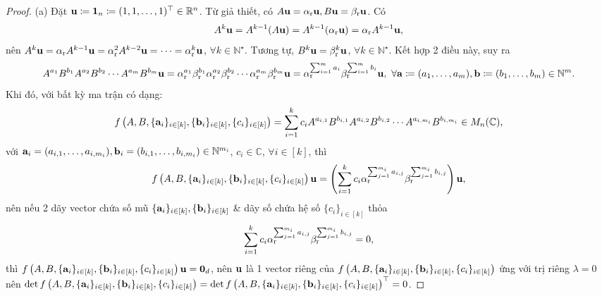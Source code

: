 \documentclass{article}
\begin{document}
\begin{proof}
	(a) Đặt ${\bf u}\coloneqq{\bf1}_n\coloneqq(1,1,\ldots,1)^\top\in\mathbb{R}^n$. Từ giả thiết, có $A{\bf u} = \alpha_{\rm r}{\bf u},B{\bf u} = \beta_{\rm r}{\bf u}$. Có
	\begin{equation*}
		A^k{\bf u} = A^{k-1}(A{\bf u}) = A^{k-1}(\alpha_{\rm r}{\bf u}) = \alpha_{\rm r}A^{k-1}{\bf u},
	\end{equation*}
	nên $A^k{\bf u} = \alpha_{\rm r}A^{k-1}{\bf u} = \alpha_{\rm r}^2A^{k-2}{\bf u} = \cdots = \alpha_{\rm r}^k{\bf u}$, $\forall k\in\mathbb{N}^\star$. Tương tự, $B^k{\bf u} = \beta_{\rm r}^k{\bf u}$, $\forall k\in\mathbb{N}^\star$. Kết hợp 2 điều này, suy ra
	\begin{equation*}
		A^{a_1}B^{b_1}A^{a_2}B^{b_2}\cdots A^{a_m}B^{b_m}{\bf u} = \alpha_{\rm r}^{a_1}\beta_{\rm r}^{b_1}\alpha_{\rm r}^{a_2}\beta_{\rm r}^{b_2}\cdots\alpha_{\rm r}^{a_m}\beta_{\rm r}^{b_m}{\bf u} = \alpha_{\rm r}^{\sum_{i=1}^m a_i}\beta_{\rm r}^{\sum_{i=1}^m b_i}{\bf u},\ \forall{\bf a}\coloneqq(a_1,\ldots,a_m),{\bf b}\coloneqq(b_1,\ldots,b_m)\in\mathbb{N}^m.
	\end{equation*}
	Khi đó, với bất kỳ ma trận có dạng:
	\begin{equation*}
		f\left(A,B,\{{\bf a}_i\}_{i\in[k]},\{{\bf b}_i\}_{i\in[k]},\{c_i\}_{i\in[k]}\right) = \sum_{i=1}^k c_iA^{a_{i,1}}B^{b_{i,1}}A^{a_{i,2}}B^{b_{i,2}}\cdots A^{a_{i,m_i}}B^{b_{i,m_i}}\in M_n(\mathbb{C}),
	\end{equation*}
	với ${\bf a}_i = (a_{i,1},\ldots,a_{i,m_i}),{\bf b}_i = (b_{i,1},\ldots,b_{i,m_i})\in\mathbb{N}^{m_i}$, $c_i\in\mathbb{C}$, $\forall i\in[k]$, thì
	\begin{equation*}
		f\left(A,B,\{{\bf a}_i\}_{i\in[k]},\{{\bf b}_i\}_{i\in[k]},\{c_i\}_{i\in[k]}\right){\bf u} = \left(\sum_{i=1}^k c_i\alpha_{\rm r}^{\sum_{j=1}^{m_i} a_{i,j}}\beta_{\rm r}^{\sum_{j=1}^{m_i} b_{i,j}}\right){\bf u},
	\end{equation*}
	nên nếu 2 dãy vector chứa số mũ $\{{\bf a}_i\}_{i\in[k]},\{{\bf b}_i\}_{i\in[k]}$ \& dãy số chứa hệ số $\{c_i\}_{i\in[k]}$ thỏa
	\begin{equation*}
		\sum_{i=1}^k c_i\alpha_{\rm r}^{\sum_{j=1}^{m_i} a_{i,j}}\beta_{\rm r}^{\sum_{j=1}^{m_i} b_{i,j}} = 0,
	\end{equation*}
	thì $f\left(A,B,\{{\bf a}_i\}_{i\in[k]},\{{\bf b}_i\}_{i\in[k]},\{c_i\}_{i\in[k]}\right){\bf u} = {\bf0}_d$, nên ${\bf u}$ là 1 vector riêng của $f\left(A,B,\{{\bf a}_i\}_{i\in[k]},\{{\bf b}_i\}_{i\in[k]},\{c_i\}_{i\in[k]}\right)$ ứng với trị riêng $\lambda = 0$ nên $\det f\left(A,B,\{{\bf a}_i\}_{i\in[k]},\{{\bf b}_i\}_{i\in[k]},\{c_i\}_{i\in[k]}\right) = \det f\left(A,B,\{{\bf a}_i\}_{i\in[k]},\{{\bf b}_i\}_{i\in[k]},\{c_i\}_{i\in[k]}\right)^\top = 0$.

\end{proof}
\end{document}
